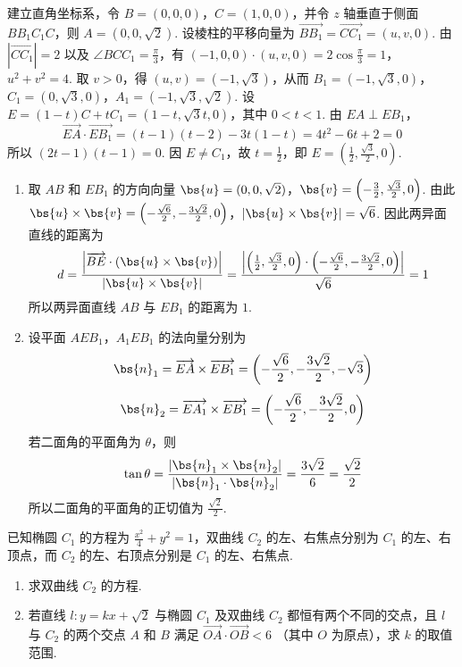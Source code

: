 \begin{solution}
建立直角坐标系，令 \(B=(0,0,0)\)，\(C=(1,0,0)\)，并令 \(z\) 轴垂直于侧面 \(BB_{1}C_{1}C\)，则 \(A=(0,0,\sqrt{2})\).
设棱柱的平移向量为 \(\overrightarrow{BB_{1}}=\overrightarrow{CC_{1}}=(u,v,0)\). 由 \(|\overrightarrow{CC_{1}}|=2\) 以及 \(\angle BCC_{1}=\frac{\pi}{3}\)，有 \((-1,0,0)\cdot(u,v,0)=2\cos\frac{\pi}{3}=1\)，\(u^{2}+v^{2}=4\).
取 \(v>0\)，得 \((u,v)=(-1,\sqrt{3})\)，从而 \(B_{1}=(-1,\sqrt{3},0)\)，\(C_{1}=(0,\sqrt{3},0)\)，\(A_{1}=(-1,\sqrt{3},\sqrt{2})\). 设 \(E=(1-t)C+tC_{1}=(1-t,\sqrt{3}t,0)\)，其中 \(0<t<1\). 由 \(EA\perp EB_{1}\)，
\[
\overrightarrow{EA}\cdot\overrightarrow{EB_{1}}=(t-1)(t-2)-3t(1-t)=4t^{2}-6t+2=0
\]
所以 \((2t-1)(t-1)=0\). 因 \(E\ne C_{1}\)，故 \(t=\frac12\)，即 \(E=\left(\frac12,\frac{\sqrt{3}}2,0\right)\).

\begin{enumerate}
\item 取 \(AB\) 和 \(EB_{1}\) 的方向向量 \(\bs{u}=(0,0,\sqrt{2})\)，\(\bs{v}=\left(-\frac32,\frac{\sqrt{3}}2,0\right)\). 由此 \(\bs{u}\times\bs{v}=\left(-\frac{\sqrt{6}}2,-\frac{3\sqrt{2}}2,0\right)\)，\(\left|\bs{u}\times\bs{v}\right|=\sqrt{6}\).
因此两异面直线的距离为
\[
d=\frac{\left|\overrightarrow{BE}\cdot(\bs{u}\times\bs{v})\right|}{\left|\bs{u}\times\bs{v}\right|}
=\frac{\left|\left(\frac12,\frac{\sqrt{3}}2,0\right)\cdot\left(-\frac{\sqrt{6}}2,-\frac{3\sqrt{2}}2,0\right)\right|}{\sqrt{6}}=1
\]
所以两异面直线 \(AB\) 与 \(EB_{1}\) 的距离为 \(1\).

\item 设平面 \(AEB_{1}\)，\(A_{1}EB_{1}\) 的法向量分别为
\[
\bs{n}_{1}=\overrightarrow{EA}\times\overrightarrow{EB_{1}}=\left(-\frac{\sqrt{6}}2,-\frac{3\sqrt{2}}2,-\sqrt{3}\right)
\]
\[
\bs{n}_{2}=\overrightarrow{EA_{1}}\times\overrightarrow{EB_{1}}=\left(-\frac{\sqrt{6}}2,-\frac{3\sqrt{2}}2,0\right)
\]
若二面角的平面角为 \(\theta\)，则
\[
\tan\theta=\frac{|\bs{n}_{1}\times\bs{n}_{2}|}{|\bs{n}_{1}\cdot\bs{n}_{2}|}=\frac{3\sqrt{2}}{6}=\frac{\sqrt{2}}2
\]
所以二面角的平面角的正切值为 \(\frac{\sqrt{2}}2\).
\end{enumerate}
\end{solution}

\begin{problem}
已知椭圆 \(C_1\) 的方程为 \(\frac{x^2}{4} + y^2 = 1\)，双曲线 \(C_2\) 的左、右焦点分别为 \(C_1\) 的左、右顶点，而 \(C_2\) 的左、右顶点分别是 \(C_1\) 的左、右焦点.

\begin{enumerate}
\item 求双曲线 \(C_2\) 的方程.
\item 若直线 \(l: y = kx + \sqrt{2}\) 与椭圆 \(C_1\) 及双曲线 \(C_2\) 都恒有两个不同的交点，且 \(l\) 与 \(C_2\) 的两个交点 \(A\) 和 \(B\) 满足 \(\overrightarrow{OA} \cdot \overrightarrow{OB} < 6\) （其中 \(O\) 为原点），求 \(k\) 的取值范围.
\end{enumerate}
\end{problem}

